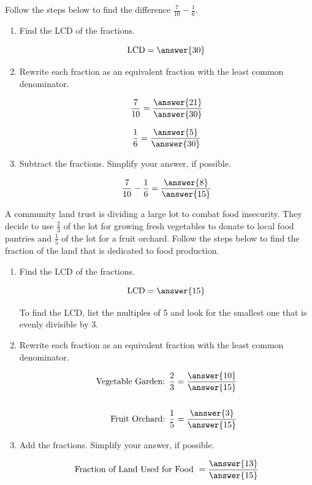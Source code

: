 \documentclass{ximera}
\begin{document}
\begin{problem}
Follow the steps below to find the difference $\frac{7}{10} - \frac{1}{6}.$ 


\begin{enumerate}
\item Find the LCD of the fractions.

\[ \textrm{LCD} = \answer{30} \] 

\item Rewrite each fraction as an equivalent fraction with the least common denominator.

\[ \frac{7}{10} = \frac{\answer{21}}{\answer{30}} \]

\[ \frac{1}{6} = \frac{\answer{5}}{\answer{30}} \]


\item Subtract the fractions.  Simplify your answer, if possible. 

\[ \frac{7}{10} - \frac{1}{6} = \frac{\answer{8}}{\answer{15}} \] 

\end{enumerate}
\end{problem}


\begin{problem}
A community land trust is dividing a large lot to combat food insecurity. They decide to use $\textstyle \frac{2}{3}$ of 
the lot for growing fresh vegetables to donate to local food pantries and $\textstyle \frac{1}{5}$ of the lot for a fruit 
orchard.  Follow the steps below to find the fraction of the land that is dedicated to food production.

\begin{enumerate}
\item Find the LCD of the fractions.

\[ \textrm{LCD} = \answer{15} \] 

\begin{hint}
      To find the LCD, list the multiples of 5 and look for the smallest one that is evenly divisible by 3. 
    \end{hint}


  \item Rewrite each fraction as an equivalent fraction with the least common denominator.

    \begin{align*}
        \text{Vegetable Garden: } \frac{2}{3} &= \frac{\answer{10}}{\answer{15}} \\
                                                & \\
        \text{Fruit Orchard: } \frac{1}{5} &= \frac{\answer{3}}{\answer{15}}
    \end{align*}

  \item Add the fractions.  Simplify your answer, if possible. 
    
  \[ \textrm{Fraction of Land Used for Food} \ = \frac{\answer{13}}{\answer{15}} \]

    \end{enumerate}
\end{problem}
\end{document}
